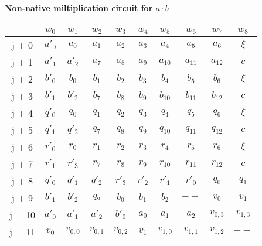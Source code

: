 \paragraph{Non-native miltiplication circuit for $a \cdot b$}
\begin{center}
    \begin{tabular}{ c|c|c|c|c|c|c|c|c|c }
        & $w_0$  & $w_1$  & $w_2$  & $w_3$  & $w_4$  & $w_5$ & $w_6$ & $w_7$ & $w_8$  \\
        \hline
        j + 0  & $a'_0$  & $a_0$ & $a_1$ & $a_2$ & $a_3$ & $a_4$ & $a_5$ & $a_6$ & $\xi$   \\
        j + 1  & $a'_1$  & $a'_2$ & $a_7$ & $a_{8}$ & $a_{9}$ & $a_{10}$ & $a_{11}$ & $a_{12}$ & $c$   \\
        j + 2  & $b'_0$ & $b_0$  & $b_1$ & $b_2$ & $b_3$ & $b_4$ & $b_5$ & $b_6$ & $\xi$   \\
        j + 3  & $b'_1$ & $b'_2$  & $b_7$  & $b_8$ & $b_9$ & $b_{10}$ & $b_{11}$ & $b_{12}$ & $c$   \\
        j + 4  & $q'_0$  & $q_0$  & $q_1$ & $q_2$ & $q_3$ & $q_4$ & $q_5$ & $q_6$ & $\xi$   \\
        j + 5  & $q'_1$ & $q'_2$& $q_7$  & $q_8$ & $q_9$ & $q_{10}$ & $q_{11}$ & $q_{12}$ & $c$   \\
        j + 6  & $r'_0$& $r_0$  & $r_1$ & $r_2$ & $r_3$ & $r_4$ & $r_5$ & $r_6$ & $\xi$   \\
        j + 7  & $r'_1$ & $r'_3$& $r_7$  & $r_8$ & $r_9$ & $r_{10}$ & $r_{11}$ & $r_{12}$ & $c$   \\
        j + 8  & $q'_0$ & $q'_1$ & $q'_2$& $r'_3$  & $r'_2$ & $r'_1$ & $r'_0$ & $q_0$ & $q_1$   \\
        j + 9  & $b'_1$ & $b'_2$& $q_2$  & $b_0$ & $b_1$ & $b_2$ & $--$ & $v_0$ & $v_1$   \\
        j + 10  & $a'_0$  & $a'_1$ & $a'_2$ & $b'_0$ & $a_0$ & $a_1$ & $a_2$ & $v_{0, 3}$ & $v_{1, 3}$   \\
        j + 11  & $v_0$  & $v_{0, 0}$ & $v_{0, 1}$ & $v_{0,2}$ & $v_1$ & $v_{1,0}$ & $v_{1, 1}$ & $v_{1, 2}$ & $--$   \\
    \end{tabular}
\end{center}

